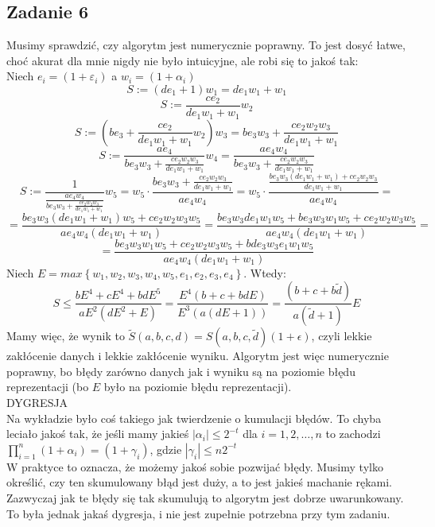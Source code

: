 \documentclass[a4paper]{article}
\begin{document}
\begin{itemize}
\subsection*{Zadanie 6}
Musimy sprawdzić, czy algorytm jest numerycznie poprawny. To jest dosyć łatwe, choć akurat dla mnie nigdy nie było intuicyjne, ale robi się to jakoś tak:\\
Niech $e_i=(1+\varepsilon_i)$ a $w_i=(1+\alpha_i)$\\
$$S:=(de_1 + 1)w_1=de_1w_1 + w_1 $$
$$S:=\frac{ce_2}{de_1w_1 + w_1}w_2 $$
$$S:=(be_3+\frac{ce_2}{de_1w_1 + w_1}w_2)w_3 = be_3w_3+\frac{ce_2w_2w_3}{de_1w_1 + w_1} $$
$$S:=\frac{ae_4}{ be_3w_3+\frac{ce_2w_2w_3}{de_1w_1 + w_1}}w_4 = \frac{ae_4w_4}{ be_3w_3+\frac{ce_2w_2w_3}{de_1w_1 + w_1}} $$
$$S:=\frac{1}{\frac{ae_4w_4}{ be_3w_3+\frac{ce_2w_2w_3}{de_1w_1 + w_1}}}w_5 = w_5\cdot\frac{be_3w_3+\frac{ce_2w_2w_3}{de_1w_1 + w_1}}{ae_4w_4} = w_5 \cdot  \frac{\frac{be_3w_3(de_1w_1 + w_1)+ce_2w_2w_3}{de_1w_1 + w_1}}{ae_4w_4} =$$
$$=\frac{be_3w_3(de_1w_1 + w_1)w_5+ce_2w_2w_3w_5}{ae_4w_4(de_1w_1 + w_1)}=\frac{be_3w_3de_1w_1w_5 + be_3w_3w_1w_5+ce_2w_2w_3w_5}{ae_4w_4(de_1w_1 + w_1)}=$$ 
$$=\frac{be_3w_3w_1w_5+ce_2w_2w_3w_5+bde_3w_3e_1w_1w_5}{ae_4w_4(de_1w_1 + w_1)} $$
Niech $E=max\left\{ w_1,w_2,w_3,w_4,w_5,e_1,e_2,e_3,e_4 \right\}$. Wtedy:
$$S\leq\frac{bE^4+cE^4+bdE^5}{aE^2(dE^2 + E)}=\frac{E^4(b+c+bdE)}{E^3(a(dE + 1))}=\frac{(b+c+b\widetilde{d})}{a(\widetilde{d} + 1)}E  $$
Mamy więc, że wynik to $\widetilde{S}(a,b,c,d)=S(a,b,c,\widetilde{d})(1+\epsilon)$, czyli lekkie zakłócenie danych i lekkie zakłócenie wyniku. Algorytm jest więc numerycznie poprawny, bo błędy zarówno danych jak i wyniku są na poziomie błędu reprezentacji (bo $E$ było na poziomie błędu reprezentacji).\\
DYGRESJA\\
Na wykładzie było coś takiego jak twierdzenie o kumulacji błędów. To chyba leciało jakoś tak, że jeśli mamy jakieś $|\alpha_i|\leq 2^{-t}$ dla $i=1,2,\ldots,n$ to zachodzi $\prod\limits_{i=1}^n (1+\alpha_i) = (1+\gamma_i)$, gdzie $|\gamma_i|\leq n 2^{-t}$\\
W praktyce to oznacza, że możemy jakoś sobie pozwijać błędy. Musimy tylko określić, czy ten skumulowany błąd jest duży, a to jest jakieś machanie rękami. Zazwyczaj jak te błędy się tak skumulują to algorytm jest dobrze uwarunkowany.\\
To była jednak jakaś dygresja, i nie jest zupełnie potrzebna przy tym zadaniu.


\end{itemize}
\end{document}
